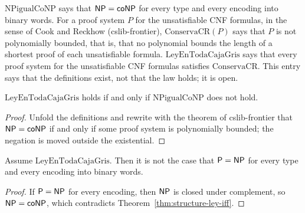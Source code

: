 \begin{definition}
  \label{def:structure-ley-caja-gris}
  \leanok
  $\mathrm{NPigualCoNP}$ says that $\mathsf{NP} = \mathsf{coNP}$ for every type and every encoding into binary
  words. For a proof system $P$ for the unsatisfiable CNF formulas, in the sense of Cook and
  Reckhow (cslib-frontier), $\mathrm{ConservaCR}(P)$ says that $P$ is not polynomially bounded, that
  is, that no polynomial bounds the length of a shortest proof of each unsatisfiable formula.
  $\mathrm{LeyEnTodaCajaGris}$ says that every proof system for the unsatisfiable CNF formulas
  satisfies $\mathrm{ConservaCR}$. This entry says that the definitions exist, not that the law holds;
  it is open.
  \own{}
\end{definition}

\begin{theorem}
  \label{thm:structure-ley-iff}
  \leanok
  $\mathrm{LeyEnTodaCajaGris}$ holds if and only if $\mathrm{NPigualCoNP}$ does not hold.
  \own{}
\end{theorem}

\begin{proof}
  \leanok
  Unfold the definitions and rewrite with the theorem of cslib-frontier that $\mathsf{NP} = \mathsf{coNP}$ if and
  only if some proof system is polynomially bounded; the negation is moved outside the existential.
\end{proof}

\begin{theorem}
  \label{thm:structure-ley-implica}
  \leanok
  Assume $\mathrm{LeyEnTodaCajaGris}$. Then it is not the case that $\mathsf{P} = \mathsf{NP}$ for every type and
  every encoding into binary words.
  \own{}
\end{theorem}

\begin{proof}
  \leanok
  If $\mathsf{P} = \mathsf{NP}$ for every encoding, then $\mathsf{NP}$ is closed under complement, so $\mathsf{NP} = \mathsf{coNP}$,
  which contradicts Theorem~\ref{thm:structure-ley-iff}.
\end{proof}

